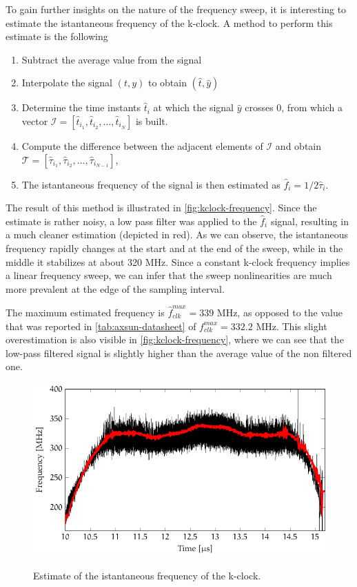 To gain further insights on the nature of the frequency sweep, it is interesting to estimate the istantaneous frequency of the k-clock. A method to perform this estimate is the following
\begin{enumerate}
	\item Subtract the average value from the signal
	\item Interpolate the signal $(t, y)$ to obtain $(\hat{t}, \hat{y})$
	\item Determine the time instants $\hat{t}_i$ at which the signal $\hat{y}$ crosses 0, from which a vector $\mathcal{I} = \left[\hat{t}_{i_1}, \hat{t}_{i_2}, \dots,  \hat{t}_{i_N}\right]$ is built.
	\item Compute the difference between the adjacent elements of $\mathcal{I}$ and obtain $\mathcal{T} = \left[\hat{\tau}_{i_1}, \hat{\tau}_{i_2}, \dots,  \hat{\tau}_{i_{N-1}}\right]$,
	\item The istantaneous frequency of the signal is then estimated as $\hat{f}_i = 1/2 \hat{\tau}_i$.
\end{enumerate} 

The result of this method is illustrated in \autoref{fig:kclock-frequency}. Since the estimate is rather noisy, a low pass filter was applied to the $\hat{f}_i$ signal, resulting in a much cleaner estimation (depicted in red). As we can observe, the istantaneous frequency rapidly changes at the start and at the end of the sweep, while in the middle it stabilizes at about 320 MHz. Since a constant k-clock frequency implies a linear frequency sweep, we can infer that the sweep nonlinearities are much more prevalent at the edge of the sampling interval. 

The maximum estimated frequency is $\hat{f}_{clk}^{max} = 339$ MHz, as opposed to the value that was reported in \autoref{tab:axsun-datasheet} of $f_{clk}^{max} = 332.2$ MHz. This slight overestimation is also visible in \autoref{fig:kclock-frequency}, where we can see that the low-pass filtered signal is slightly higher than the average value of the non filtered one.

\begin{figure}[hbt]
	\myfloatalign
	{\includegraphics[width=0.8\linewidth]{gfx/ch3/lowpass}}\\
	\caption{Estimate of the istantaneous frequency of the k-clock.}\label{fig:kclock-frequency}
\end{figure}

